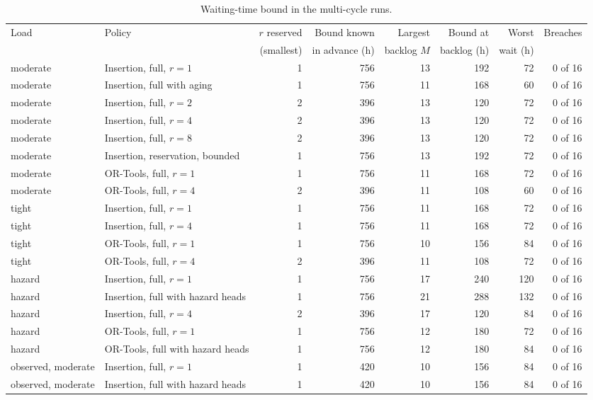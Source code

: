 \begin{table}[!htbp]
\caption{Waiting-time bound in the multi-cycle runs.}
\label{tab:bound}
\centering
\footnotesize
\setlength{\tabcolsep}{3pt}
\begin{tabular}{llrrrrrr}
\toprule
Load & Policy & $r$ reserved & Bound known & Largest & Bound at & Worst & Breaches \\
 & & (smallest) & in advance (h) & backlog $M$ & backlog (h) & wait (h) & \\
\midrule
moderate & Insertion, full, $r = 1$ & 1 & 756 & 13 & 192 & 72 & 0 of 16 \\
moderate & Insertion, full with aging & 1 & 756 & 11 & 168 & 60 & 0 of 16 \\
moderate & Insertion, full, $r = 2$ & 2 & 396 & 13 & 120 & 72 & 0 of 16 \\
moderate & Insertion, full, $r = 4$ & 2 & 396 & 13 & 120 & 72 & 0 of 16 \\
moderate & Insertion, full, $r = 8$ & 2 & 396 & 13 & 120 & 72 & 0 of 16 \\
moderate & Insertion, reservation, bounded & 1 & 756 & 13 & 192 & 72 & 0 of 16 \\
moderate & OR-Tools, full, $r = 1$ & 1 & 756 & 11 & 168 & 72 & 0 of 16 \\
moderate & OR-Tools, full, $r = 4$ & 2 & 396 & 11 & 108 & 60 & 0 of 16 \\
tight & Insertion, full, $r = 1$ & 1 & 756 & 11 & 168 & 72 & 0 of 16 \\
tight & Insertion, full, $r = 4$ & 1 & 756 & 11 & 168 & 72 & 0 of 16 \\
tight & OR-Tools, full, $r = 1$ & 1 & 756 & 10 & 156 & 84 & 0 of 16 \\
tight & OR-Tools, full, $r = 4$ & 2 & 396 & 11 & 108 & 72 & 0 of 16 \\
hazard & Insertion, full, $r = 1$ & 1 & 756 & 17 & 240 & 120 & 0 of 16 \\
hazard & Insertion, full with hazard heads & 1 & 756 & 21 & 288 & 132 & 0 of 16 \\
hazard & Insertion, full, $r = 4$ & 2 & 396 & 17 & 120 & 84 & 0 of 16 \\
hazard & OR-Tools, full, $r = 1$ & 1 & 756 & 12 & 180 & 72 & 0 of 16 \\
hazard & OR-Tools, full with hazard heads & 1 & 756 & 12 & 180 & 84 & 0 of 16 \\
observed, moderate & Insertion, full, $r = 1$ & 1 & 420 & 10 & 156 & 84 & 0 of 16 \\
observed, moderate & Insertion, full with hazard heads & 1 & 420 & 10 & 156 & 84 & 0 of 16 \\

\end{tabular}
\end{table}
